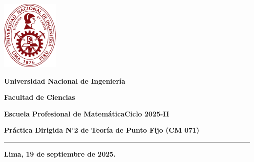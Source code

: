 



\noindent\parbox[c]{.18\textwidth}{\includegraphics[width=2.8cm]{logouni}}\hfill
\parbox[c]{1\textwidth}{\raggedright%
	{\large\textbf{Universidad Nacional de Ingeniería} \par\smallskip}
	{\large\textbf{Facultad de Ciencias} \par\smallskip}
	{\large\textbf{Escuela Profesional de Matemática}\hfil\qquad\qquad\qquad\textbf{Ciclo 2025-II}}
}

\begin{center}\bfseries\large
	Práctica Dirigida N$^{\circ}$2 de Teoría de Punto Fijo (CM 071)
\end{center}

\vspace{-0.5cm}

\hrulefill
\vspace{-2.5mm}

\rule{16.5cm}{0.8mm}

\begin{questions}
	
\end{questions}

\vfill
\begin{flushright}\bfseries
	Lima, 19 de septiembre de 2025.
\end{flushright}

\clearpage

\appendix



